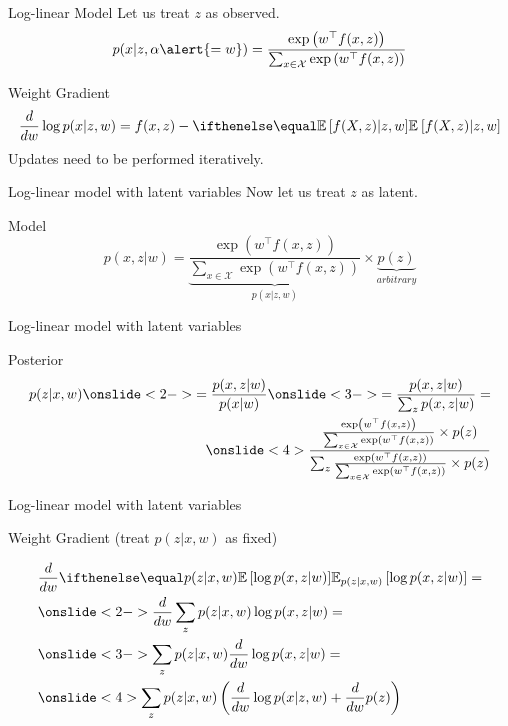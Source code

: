 \documentclass[14pt]{beamer}
\begin{document}
\begin{frame}{Log-linear Model}
Let us treat $ z $ as observed.
\begin{equation*}
p(x|z,\alpha\alert{=w}) = \frac{\exp\left(w^{\top}f(x,z)\right)}{\sum_{x\in \mathcal{X}}\exp\left(w^{\top}f(x,z)\right)}
\end{equation*}
\pause
\begin{block}{Weight Gradient}
\begin{equation*}
\frac{d}{dw}\log p(x|z,w) = f(x,z) - \E{f(X,z)|z,w} 
\end{equation*}
\pause
Updates need to be performed iteratively.
\end{block}
\end{frame}

\begin{frame}{Log-linear model with latent variables}
Now let us treat $ z $ as latent.
\pause
\begin{block}{Model}
\begin{equation*}
p(x,z|w) = \underbrace{\frac{\exp\left(w^{\top}f(x,z)\right)}{\sum_{x\in \mathcal{X}}\exp\left(w^{\top}f(x,z)\right)}}_{p(x|z, w)} 
\times \underbrace{p(z)}_{arbitrary}
\end{equation*}
\end{block}
\end{frame}

\begin{frame}{Log-linear model with latent variables}
\begin{block}{Posterior}
\begin{align*}
p(z|x,w) \onslide<2->{= \frac{p(x,z|w)}{p(x|w)}} \onslide<3->{= \frac{p(x,z|w)}{\sum_{z} p(x,z|w)} =} \\
\onslide<4>{\dfrac{\frac{\exp\left(w^{\top}f(x,z)\right)}{\sum_{x\in \mathcal{X}}\exp\left(w^{\top}f(x,z)\right)} \times p(z)}
{\sum_{z} \frac{\exp\left(w^{\top}f(x,z)\right)}{\sum_{x\in \mathcal{X}}\exp\left(w^{\top}f(x,z)\right)} \times p(z)}}
\end{align*}
\end{block}
\end{frame}

\begin{frame}{Log-linear model with latent variables}
\begin{block}{Weight Gradient (treat $ p(z|x,w) $ as fixed)}
\begin{small}
\begin{align*}
&\frac{d}{dw}\E[p(z|x,w)]{\log p(x,z|w)} = \\ 
&\onslide<2->{\frac{d}{dw}\sum_{z}p(z|x,w) \log p(x,z|w) =} \\
&\onslide<3->{\sum_{z}p(z|x,w)  \frac{d}{dw}\log p(x,z|w) =} \\
&\onslide<4>{\sum_{z}p(z|x,w) \left( \frac{d}{dw}\log p(x|z,w) + \frac{d}{dw} p(z) \right)}
\end{align*}
\end{small}
\end{block}
\end{frame}
\end{document}
